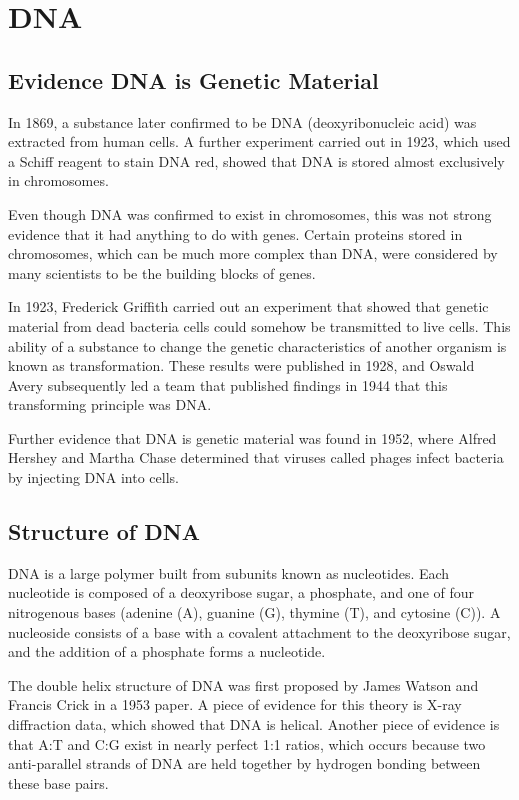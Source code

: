\documentclass[12pt,titlepage]{article}
\begin{document}
  \section{DNA}

    \subsection{Evidence DNA is Genetic Material}
      In 1869, a substance later confirmed to be DNA (deoxyribonucleic acid) was extracted from human cells. A further experiment carried out in 1923, which
      used a Schiff reagent to stain DNA red, showed that DNA is stored almost exclusively in chromosomes.

      Even though DNA was confirmed to exist in chromosomes, this was not strong evidence that it had anything to do with genes. Certain proteins stored in
      chromosomes, which can be much more complex than DNA, were considered by many scientists to be the building blocks of genes.

      In 1923, Frederick Griffith carried out an experiment that showed that genetic material from dead bacteria cells could somehow be transmitted to live cells. 
      This ability of a substance to change the genetic characteristics of another organism is known as transformation. These results were published in 1928, and
      Oswald Avery subsequently led a team that published findings in 1944 that this transforming principle was DNA.

      Further evidence that DNA is genetic material was found in 1952, where Alfred Hershey and Martha Chase determined that viruses called phages infect bacteria
      by injecting DNA into cells.

    \subsection{Structure of DNA}
      DNA is a large polymer built from subunits known as nucleotides. Each nucleotide is composed of a deoxyribose sugar, a phosphate, and one of four nitrogenous
      bases (adenine (A), guanine (G), thymine (T), and cytosine (C)). A nucleoside consists of a base with a covalent attachment to the deoxyribose sugar, and the
      addition of a phosphate forms a nucleotide.

      The double helix structure of DNA was first proposed by James Watson and Francis Crick in a 1953 paper. A piece of evidence for this theory is X-ray diffraction
      data, which showed that DNA is helical. Another piece of evidence is that A:T and C:G exist in nearly perfect 1:1 ratios, which occurs because two anti-parallel
      strands of DNA are held together by hydrogen bonding between these base pairs.
\end{document}
